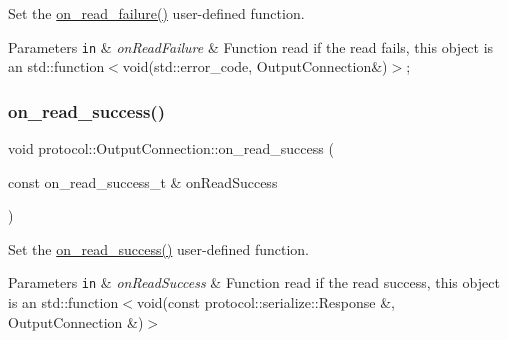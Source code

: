Set the \hyperlink{classprotocol_1_1_output_connection_aa3e70f574e6db59202aa4a9cdcad7216}{on\+\_\+read\+\_\+failure()} user-\/defined function. 


\begin{DoxyParams}[1]{Parameters}
\mbox{\tt in}  & {\em on\+Read\+Failure} & Function read if the read fails, this object is an std\+::function$<$void(std\+::error\+\_\+code, Output\+Connection\&)$>$; \\
\hline
\end{DoxyParams}
\mbox{\label{classprotocol_1_1_output_connection_a3592638f2e736b85d0cd094d94bacdcf}} 
\subsubsection{\texorpdfstring{on\+\_\+read\+\_\+success()}{on\_read\_success()}}
{\footnotesize\ttfamily void protocol\+::\+Output\+Connection\+::on\+\_\+read\+\_\+success (\begin{DoxyParamCaption}\item[{const on\+\_\+read\+\_\+success\+\_\+t \&}]{on\+Read\+Success }\end{DoxyParamCaption})}



Set the \hyperlink{classprotocol_1_1_output_connection_a3592638f2e736b85d0cd094d94bacdcf}{on\+\_\+read\+\_\+success()} user-\/defined function. 


\begin{DoxyParams}[1]{Parameters}
\mbox{\tt in}  & {\em on\+Read\+Success} & Function read if the read success, this object is an std\+::function$<$void(const protocol\+::serialize\+::\+Response \&, Output\+Connection \&)$>$ \\
\hline
\end{DoxyParams}
\mbox{\label{classprotocol_1_1_output_connection_a2c70a552249924bd75e0fe472722c1fc}} 
